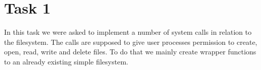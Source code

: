 \documentclass[11pt]{article}
\begin{document}

\clearpage
\maketitle
\thispagestyle{empty}

\newpage




\section{Task 1}
In this task we were asked to implement a number of system calls in relation to
the filesystem.  The calls are supposed to give user processes permission to
create, open, read, write and delete files.  To do that we mainly create wrapper
functions to an already existing simple filesystem. \\
\end{document}
